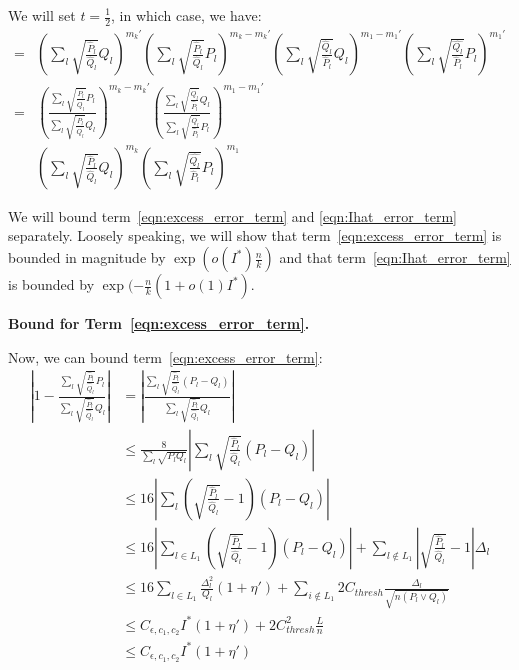 \documentclass{article}
\begin{document}
We will set $t = \frac{1}{2}$, in which case, we have:
\begin{align}
=& \left( \sum_l \sqrt{\frac{\hat{P}_l}{\hat{Q}_l} } Q_l \right)^{m_k'}
 \left( \sum_l \sqrt{\frac{\hat{P}_l}{\hat{Q}_l} } P_l \right)^{m_k - m_k'}
 \left( \sum_l \sqrt{\frac{\hat{Q}_l}{\hat{P}_l} } Q_l \right)^{m_1 - m_1'}
       \left( \sum_l \sqrt{\frac{\hat{Q_l}}{\hat{P}_l} } P_l \right)^{m_1'} \nonumber \\
=&  \left( \frac{\sum_l \sqrt{\frac{\hat{P}_l}{\hat{Q}_l} } P_l}
                {\sum_l \sqrt{\frac{\hat{P}_l}{\hat{Q}_l} } Q_l}  \right)^{m_k - m_k'}
 \left( \frac{ \sum_l \sqrt{\frac{\hat{Q}_l}{\hat{P}_l} } Q_l}
             { \sum_l \sqrt{\frac{\hat{Q}_l}{\hat{P}_l} } P_l} \right)^{m_1 - m_1'}  
   \label{eqn:excess_error_term} \\
 & \left( \sum_l \sqrt{ \frac{\hat{P}_l}{\hat{Q}_l}} Q_l \right)^{m_k} 
    \left( \sum_l \sqrt{\frac{\hat{Q_l}}{\hat{P}_l} } P_l \right)^{m_1}
   \label{eqn:Ihat_error_term} 
\end{align} 

We will bound term~\ref{eqn:excess_error_term} and \ref{eqn:Ihat_error_term} separately. Loosely speaking, we will show that term~\ref{eqn:excess_error_term} is bounded in magnitude by $\exp( o(I^*) \frac{n}{k} )$ and that term~\ref{eqn:Ihat_error_term} is bounded by $\exp( - \frac{n}{k} (1 + o(1) I^*)$. 


\textbf{Bound for Term~\ref{eqn:excess_error_term}.} 

Now, we can bound term~\ref{eqn:excess_error_term}:
\begin{align*}
\left| 1 -  \frac{\sum_l \sqrt{\frac{\hat{P}_l}{\hat{Q}_l} } P_l}
                {\sum_l \sqrt{\frac{\hat{P}_l}{\hat{Q}_l} } Q_l}  \right|
 &= \left| \frac{ \sum_l \sqrt{ \frac{\hat{P}_l}{\hat{Q}_l}} (P_l - Q_l) }
     { \sum_l \sqrt{ \frac{\hat{P}_l}{\hat{Q}_l}} Q_l } \right| \\
&\leq \frac{8}{\sum_l \sqrt{P_l Q_l}} 
     \left| \sum_l \sqrt{ \frac{\hat{P}_l}{\hat{Q}_l} }(P_l - Q_l) \right| \\
&\leq 16 \left|  \sum_{l} \left( \sqrt{ \frac{\hat{P}_l}{\hat{Q}_l} } - 1 \right) (P_l - Q_l)  \right| \\
&\leq 16 \left| 
     \sum_{l \in L_1} \left( \sqrt{\frac{\hat{P}_l}{\hat{Q}_l}} - 1 \right)(P_l - Q_l) 
     \right| + \sum_{l \notin L_1} \left| \sqrt{ \frac{\hat{P}_l}{\hat{Q}_l}} - 1 \right| \Delta_l \\
&\leq 16 \sum_{l \in L_1} \frac{\Delta^2_l}{Q_l}(1+ \eta') + 
      \sum_{i \notin L_1} 2 C_{thresh} \frac{\Delta_l}{\sqrt{n (P_l \vee Q_l)}} \\
&\leq C_{\epsilon, c_1, c_2} I^* (1 + \eta') + 2 C_{thresh}^2 \frac{L}{n} \\
&\leq C_{\epsilon, c_1, c_2} I^* (1 + \eta')
\end{align*}
\end{document}
